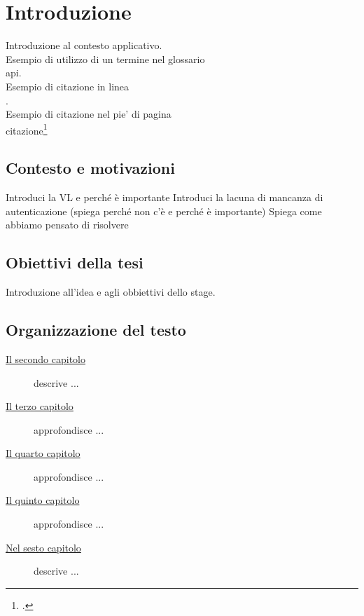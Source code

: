 \chapter{Introduzione}
\label{cap:introduzione}

Introduzione al contesto applicativo.\\

\noindent Esempio di utilizzo di un termine nel glossario \\
\gls{api}. \\

\noindent Esempio di citazione in linea \\
\cite{site:agile-manifesto}. \\

\noindent Esempio di citazione nel pie' di pagina \\
citazione\footcite{womak:lean-thinking} \\

\section{Contesto e motivazioni}
Introduci la VL e perché è importante
Introduci la lacuna di mancanza di autenticazione (spiega perché non c'è e perché è importante)
Spiega come abbiamo pensato di risolvere

\section{Obiettivi della tesi}

Introduzione all'idea e agli obbiettivi dello stage.

\section{Organizzazione del testo}

\begin{description}
    \item[{\hyperref[cap:background]{Il secondo capitolo}}] descrive ...
    
    \item[{\hyperref[cap:analisi]{Il terzo capitolo}}] approfondisce ...
    
    \item[{\hyperref[cap:progettazione]{Il quarto capitolo}}] approfondisce ...
    
    \item[{\hyperref[cap:test]{Il quinto capitolo}}] approfondisce ...
        
    \item[{\hyperref[cap:conclusioni]{Nel sesto capitolo}}] descrive ...
\end{description}

